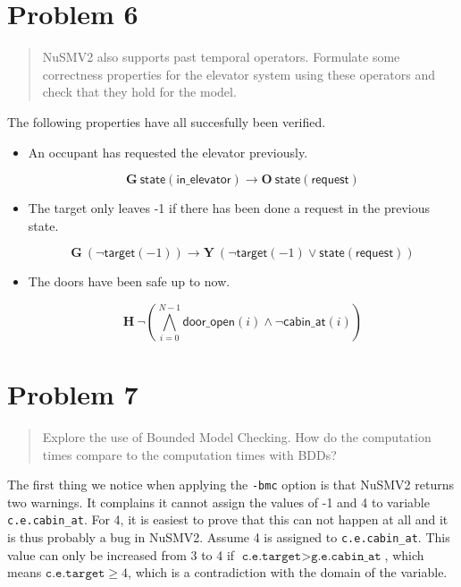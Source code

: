 \documentclass[a4paper,10pt]{article}
\newcommand{\LTLG}{\mathbf{G~}}
\newcommand{\LTLO}{\mathbf{O~}}
\newcommand{\LTLY}{\mathbf{Y~}}
\newcommand{\LTLH}{\mathbf{H~}}
\newcommand{\conjall}[2]{\mathop{\bigwedge}\limits_{#1}^{#2}}
\newcommand{\dooropen}[1]{\mathsf{door\_open}(#1)}
\newcommand{\cabinat}[1]{\mathsf{cabin\_at}(#1)}
\newcommand{\target}[1]{\mathsf{target}(#1)}
\newcommand{\state}[1]{\mathsf{state}(\mathsf{#1})}
\newcommand{\imply}{\rightarrow}
\begin{document}
	
	\section{Problem 6}
	
	\begin{quote}
		NuSMV2 also supports past temporal operators. Formulate some correctness properties for the elevator system using these operators and check that they hold for the model.
	\end{quote}
	
	The following properties have all succesfully been verified.
	
	\begin{itemize}
		\item
			An occupant has requested the elevator previously.
		
			\[
				\LTLG \state{in\_elevator} \imply \LTLO \state{request}
			\]
		
		\item
			The target only leaves -1 if there has been done a request in the previous state.
			
			\[
				\LTLG (\neg \target{-1}) \imply \LTLY (\neg \target{-1} \vee \state{request})
			\]
		
		\item
			The doors have been safe up to now.
			
			\[
				\LTLH \neg \left( \conjall{i=0}{N-1} \dooropen{i} \wedge \neg \cabinat{i} \right)
			\]
	\end{itemize}
	
	\section{Problem 7}
	
	\begin{quote}
		Explore the use of Bounded Model Checking. How do the computation times compare to the computation times with BDDs?
	\end{quote}

	
	The first thing we notice when applying the \texttt{-bmc} option is that NuSMV2 returns two warnings. It complains it cannot assign the values of -1 and 4 to variable \texttt{c.e.cabin\_at}. For 4, it is easiest to prove that this can not happen at all and it is thus probably a bug in NuSMV2. Assume 4 is assigned to \texttt{c.e.cabin\_at}. This value can only be increased from 3 to 4 if \(\texttt{c.e.target} > \texttt{g.e.cabin\_at}\), which means \(\texttt{c.e.target} \ge 4\), which is a contradiction with the domain of the variable.
	
\end{document}
